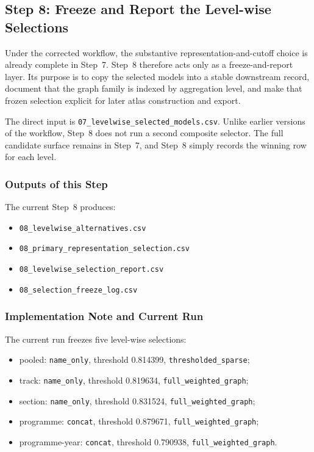 \subsection{Step 8: Freeze and Report the Level-wise Selections}
\label{sec:step8}

Under the corrected workflow, the substantive representation-and-cutoff choice is already complete in Step~7. Step~8 therefore acts only as a freeze-and-report layer. Its purpose is to copy the selected models into a stable downstream record, document that the graph family is indexed by aggregation level, and make that frozen selection explicit for later atlas construction and export.

The direct input is \texttt{07\_levelwise\_selected\_models.csv}. Unlike earlier versions of the workflow, Step~8 does not run a second composite selector. The full candidate surface remains in Step~7, and Step~8 simply records the winning row for each level.

\subsubsection{Outputs of this Step}
\label{sec:step8_outputs}

The current Step~8 produces:
\begin{itemize}
    \item \texttt{08\_levelwise\_alternatives.csv}
    \item \texttt{08\_primary\_representation\_selection.csv}
    \item \texttt{08\_levelwise\_selection\_report.csv}
    \item \texttt{08\_selection\_freeze\_log.csv}
\end{itemize}

\subsubsection{Implementation Note and Current Run}
\label{sec:step8_implementation_note}

The current run freezes five level-wise selections:
\begin{itemize}
    \item pooled: \texttt{name\_only}, threshold 0.814399, \texttt{thresholded\_sparse};
    \item track: \texttt{name\_only}, threshold 0.819634, \texttt{full\_weighted\_graph};
    \item section: \texttt{name\_only}, threshold 0.831524, \texttt{full\_weighted\_graph};
    \item programme: \texttt{concat}, threshold 0.879671, \texttt{full\_weighted\_graph};
    \item programme-year: \texttt{concat}, threshold 0.790938, \texttt{full\_weighted\_graph}.
\end{itemize}

